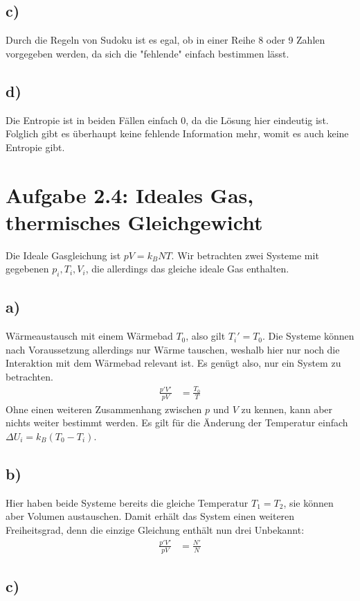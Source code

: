 \documentclass[a4paper,12pt]{article}
\begin{document}
\subsection*{c)}
Durch die Regeln von Sudoku ist es egal, ob in einer Reihe 8 oder 9 Zahlen vorgegeben werden, da sich die "fehlende" einfach bestimmen lässt.
\subsection*{d)}
Die Entropie ist in beiden Fällen einfach 0, da die Lösung hier eindeutig ist. Folglich gibt es überhaupt keine fehlende Information mehr, womit es auch keine Entropie gibt. 
\section*{Aufgabe 2.4: Ideales Gas, thermisches Gleichgewicht}
Die Ideale Gasgleichung ist $pV=k_BNT$. Wir betrachten zwei Systeme mit gegebenen $p_i,T_i,V_i$, die allerdings das gleiche ideale Gas enthalten.
\subsection*{a)}Wärmeaustausch mit einem Wärmebad $T_0$, also gilt $T_i'=T_0$. Die Systeme können nach Voraussetzung allerdings nur Wärme tauschen, weshalb hier nur noch die Interaktion mit dem Wärmebad relevant ist. Es genügt also, nur ein System zu betrachten.
\begin{align*}
\frac{p'V'}{pV}&=\frac{T_0}{T}
\end{align*}
Ohne einen weiteren Zusammenhang zwischen $p$ und $V$ zu kennen, kann aber nichts weiter bestimmt werden. Es gilt für die Änderung der Temperatur einfach $\Delta U_i=k_B(T_0-T_i)$.
\subsection*{b)}
Hier haben beide Systeme bereits die gleiche Temperatur $T_1=T_2$, sie können aber Volumen austauschen. Damit erhält das System einen weiteren Freiheitsgrad, denn die einzige Gleichung enthält nun drei Unbekannt:
\begin{align*}
\frac{p'V'}{pV}&=\frac{N'}{N}
\end{align*}
\subsection*{c)}
\end{document}
